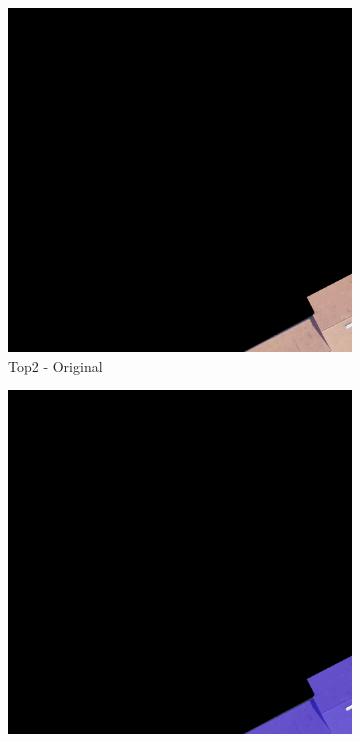 \begin{figure}[H]
\begin{subfigure}{0.32\textwidth}
    \includegraphics[width=\textwidth]{02-main//figures/ch4/kfold_ensembles/linknet_timm-efficientnet-b5/best_cases/best_4_iou0.992_24931113_tile_13_18_a66e08_original.png}
    \caption{Top2 - Original}
\end{subfigure}
\hfill
\begin{subfigure}{0.32\textwidth}
    \includegraphics[width=\textwidth]{02-main//figures/ch4/kfold_ensembles/linknet_timm-efficientnet-b5/best_cases/best_4_iou0.992_24931113_tile_13_18_a66e08_overlay_gt.png}

\end{subfigure}
\end{figure}
